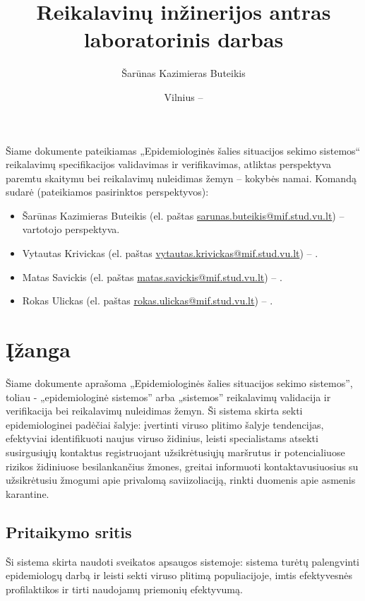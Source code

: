\documentclass{VUMIFPSkursinis}
\title{Reikalavinų inžinerijos antras laboratorinis darbas}
\author{Šarūnas Kazimieras Buteikis}
\date{Vilnius – \the\year}
\begin{document}
\maketitle


Šiame dokumente pateikiamas „Epidemiologinės šalies situacijos sekimo sistemos“ reikalavimų specifikacijos validavimas ir verifikavimas, atliktas
perspektyva paremtu skaitymu bei reikalavimų nuleidimas žemyn -- kokybės namai. Komandą sudarė (pateikiamos pasirinktos perspektyvos):
\begin{itemize}
	\item Šarūnas Kazimieras Buteikis (el. paštas \href{mailto:sarunas.buteikis@mif.stud.vu.lt}{sarunas.buteikis@mif.stud.vu.lt}) -- vartotojo perspektyva.
	\item Vytautas Krivickas (el. paštas \href{mailto:vytautas.krivickas@mif.stud.vu.lt}{vytautas.krivickas@mif.stud.vu.lt}) -- .
	\item Matas Savickis (el. paštas \href{mailto:matas.savickis@mif.stud.vu.lt}{matas.savickis@mif.stud.vu.lt}) -- .
	\item Rokas Ulickas (el. paštas \href{mailto:rokas.ulickas@mif.stud.vu.lt}{rokas.ulickas@mif.stud.vu.lt}) -- .
\end{itemize}

\newpage

\tableofcontents


\section{Įžanga}
Šiame dokumente aprašoma „Epidemiologinės šalies situacijos sekimo sistemos”, toliau - „epidemiologinė sistemos” arba „sistemos”
reikalavimų validacija ir verifikacija bei reikalavimų nuleidimas žemyn.
Ši sistema skirta sekti epidemiologinei padėčiai šalyje: įvertinti viruso plitimo šalyje tendencijas,
efektyviai identifikuoti naujus viruso židinius, leisti specialistams atsekti susirgusiųjų
kontaktus registruojant užsikrėtusiųjų maršrutus ir potencialiuose rizikos židiniuose
besilankančius žmones, greitai informuoti kontaktavusiuosius su užsikrėtusiu žmogumi
apie privalomą saviizoliaciją, rinkti duomenis apie asmenis karantine.

\subsection{Pritaikymo sritis}
Ši sistema skirta naudoti sveikatos apsaugos sistemoje: sistema turėtų palengvinti
epidemiologų darbą ir leisti sekti viruso plitimą populiacijoje, imtis efektyvesnės
profilaktikos ir tirti naudojamų priemonių efektyvumą.
\end{document}
